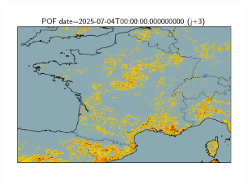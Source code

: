 \documentclass{article}
\begin{document}
\begin{figure}[H]
    \begin{subfigure}[b]{0.32\textwidth}
        \centering
        \includegraphics[width=\linewidth]{general_pof_j3.png} %
    \end{subfigure}
\end{figure}
\end{document}

